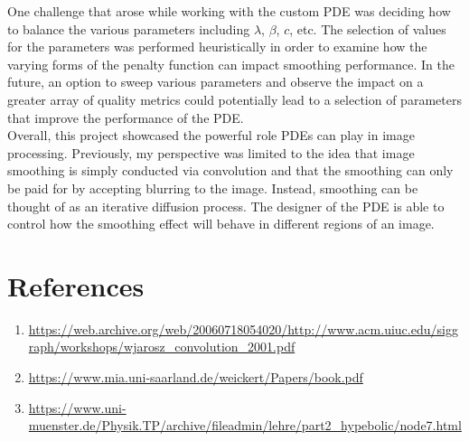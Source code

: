 \documentclass{article}
\begin{document}
  \noindent
  One challenge that arose while working with the custom PDE was deciding
  how to balance the various parameters including $\lambda$, $\beta$,
  $c$, etc. The selection of values for the parameters was performed
  heuristically in order to examine how the varying forms of the
  penalty function can impact smoothing performance. In the future,
  an option to sweep various parameters and observe the impact
  on a greater array of quality metrics could potentially lead to
  a selection of parameters that improve the performance
  of the PDE.\\

  \noindent
  Overall, this project showcased the powerful role PDEs can
  play in image processing. Previously, my perspective was limited
  to the idea that image smoothing is simply conducted via convolution
  and that the smoothing can only be paid for by accepting
  blurring to the image. Instead, smoothing can be thought of 
  as an iterative diffusion process. The designer of the
  PDE is able to control how the smoothing effect will
  behave in different regions of an image.


  \newpage
  \section{References}
  \begin{enumerate}
    \item \url{https://web.archive.org/web/20060718054020/http://www.acm.uiuc.edu/siggraph/workshops/wjarosz_convolution_2001.pdf}
    \item \url{https://www.mia.uni-saarland.de/weickert/Papers/book.pdf}
    \item \url{https://www.uni-muenster.de/Physik.TP/archive/fileadmin/lehre/part2_hypebolic/node7.html}
  \end{enumerate}
\end{document}
